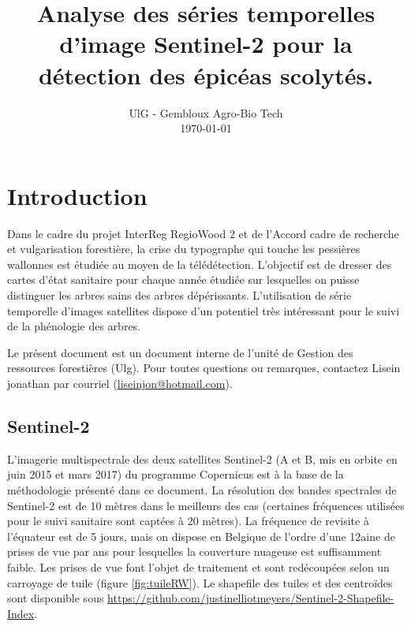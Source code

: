 \documentclass[a4paper, 12pt]{article} %
\title{Analyse des séries temporelles d'image Sentinel-2 pour la détection des épicéas scolytés.}
\date{%
    UlG - Gembloux Agro-Bio Tech
    \\
    \today
}
\begin{document}
\maketitle

\tableofcontents

\section{Introduction}

Dans le cadre du projet InterReg RegioWood 2 et de l'Accord cadre de recherche et vulgarisation forestière, la crise du typographe qui touche les pessières wallonnes est étudiée au moyen de la télédétection. L'objectif est de dresser des cartes d'état sanitaire pour chaque année étudiée sur lesquelles on puisse distinguer les arbres sains des arbres dépérissants. L'utilisation de série temporelle d'images satellites dispose d'un potentiel très intéressant pour le suivi de la phénologie des arbres.

Le présent document est un document interne de l'unité de Gestion des ressources forestières (Ulg). Pour toutes questions ou remarques, contactez Lisein jonathan par courriel (\href{mailto:liseinjon@hotmail.com}{liseinjon@hotmail.com}).

\subsection{Sentinel-2}

L'imagerie multispectrale des deux satellites Sentinel-2 (A et B, mis en orbite en juin 2015 et mars 2017) du programme Copernicus est à la base de la méthodologie présenté dans ce document. La résolution des bandes spectrales de Sentinel-2 est de 10 mètres dans le meilleurs des cas (certaines fréquences utilisées pour le suivi sanitaire sont captées à 20 mètres). La fréquence de revisite à l'équateur est de 5 jours, mais on dispose en Belgique de l'ordre d'une 12aine de prises de vue par ans pour lesquelles la couverture nuageuse est suffisamment faible. Les prises de vue font l'objet de traitement et sont redécoupées selon un carroyage de tuile (figure \ref{fig:tuileRW}). Le shapefile des tuiles et des centroïdes sont disponible sous \url{https://github.com/justinelliotmeyers/Sentinel-2-Shapefile-Index}.
\end{document}
